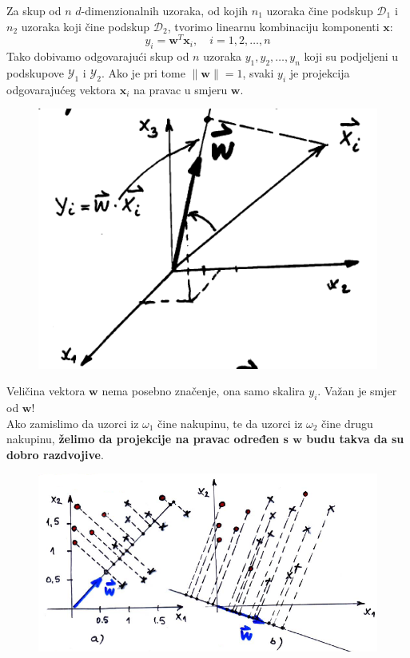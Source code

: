 \documentclass{book}
\begin{document}
Za skup od $n$ $d$-dimenzionalnih uzoraka, od kojih $n_1$ uzoraka čine podskup
$\mathcal{D}_1$ i $n_2$ uzoraka koji čine podskup $\mathcal{D}_2$, tvorimo
linearnu kombinaciju komponenti $\mathbf{x}$: 
$$ y_i = \mathbf{w}^T\mathbf{x}_i, \quad i=1,2,\ldots,n $$
Tako dobivamo odgovarajući skup od $n$ uzoraka $y_1,y_2,\ldots,y_n$ koji su
podjeljeni u podskupove $\mathcal{Y}_1$ i $\mathcal{Y}_2$. Ako je pri tome
$\lVert  \mathbf{w} \rVert = 1$, svaki $y_i$ je projekcija odgovarajućeg vektora
$\mathbf{x}_i$ na pravac u smjeru $\mathbf{w}$.

\begin{figure}[H]
\begin{center}
\includegraphics[scale=0.5]{./pics/fisher_projekcija}
\end{center}
\end{figure}

Veličina vektora $\mathbf{w}$ nema posebno značenje, ona samo skalira $y_i$.
Važan je smjer od $\mathbf{w}$! \\

Ako zamislimo da uzorci iz $\omega_1$ čine nakupinu, te da uzorci iz $\omega_2$
čine drugu nakupinu, \textbf{želimo da projekcije na pravac određen s
$\mathbf{w}$ budu takva da su dobro razdvojive}.

\begin{figure}[H]
\begin{center}
\includegraphics[scale=0.5]{./pics/fisher_primjer}
\end{center}
\end{figure}
\end{document}
